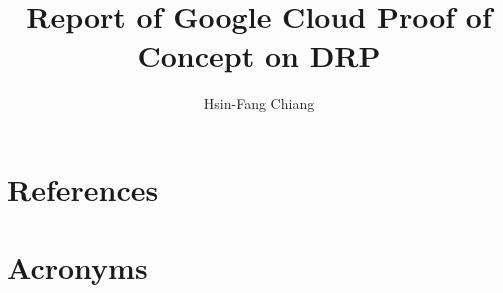 \documentclass[DM,authoryear,toc,lsstdraft]{lsstdoc}
\title{Report of Google Cloud Proof of Concept on DRP}
\author{%
Hsin-Fang Chiang
}
\date{\vcsDate}
\begin{document}
\maketitle



\appendix
\section{References} \label{sec:bib}
\renewcommand{\refname}{} %


\section{Acronyms} \label{sec:acronyms}

\end{document}
